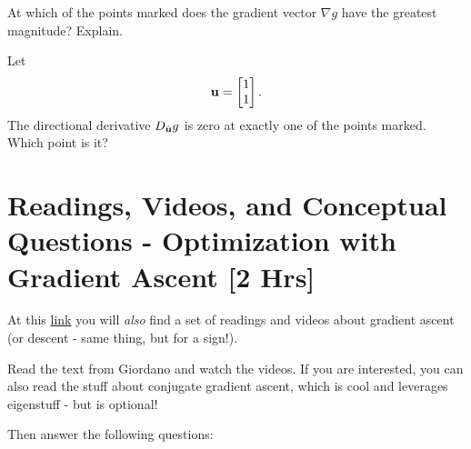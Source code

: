 \documentclass[M3_Night4_Solutions]{subfiles}
\begin{document}
\item
At which of the points marked does the gradient 
vector $\nabla g$ have the greatest magnitude?  Explain.
\item
Let  
\[ \mathbf{u} = \begin{bmatrix} 1 \\ 1 \end{bmatrix}.\]
The directional derivative $D_{\hat{\mathbf{u}}} g$ is zero at exactly one of the points marked.  Which point is it?

\ee

\ee




\section{Readings, Videos, and Conceptual Questions - Optimization with  Gradient Ascent [2 Hrs]}
At this  \href{https://sites.google.com/site/linearity2fall2014/partial-derivative-videos}{link}  you will {\it also} find a set of readings and videos about gradient ascent (or descent - same thing, but for a sign!). 

Read the text from Giordano and watch the videos.  If you are interested, you can also read the stuff about conjugate gradient ascent, which is cool and leverages eigenstuff - but is optional! 

Then answer the following questions: 
\end{document}
